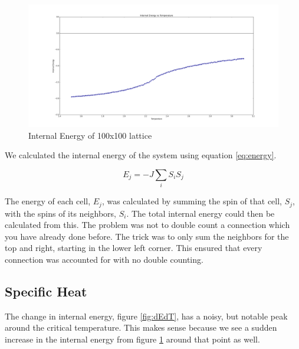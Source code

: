 \documentclass[a4paper,twoside,12pt]{article}
\begin{document}
\begin{figure}[h]
\centering
\includegraphics[scale=0.2]{Figures/energy2.png}
\caption{Internal Energy of 100x100 lattice}
\label{fig:energy2}
\end{figure} 

\noindent We calculated the internal energy of the system using equation \ref{eq:energy}.

\begin{equation}
\label{eq:energy}
E_{j} = -J\sum_{i} S_{i}S_{j}
\end{equation}

\noindent The energy of each cell, $E_{j}$, was calculated by summing the spin of that cell, $S_{j}$, with the spins of its neighbors, $S_{i}$. The total internal energy could then be calculated from this. The problem was not to double count a connection which you have already done before. The trick was to only sum the neighbors for the top and right, starting in the lower left corner. This ensured that every connection was accounted for with no double counting.

\subsection{Specific Heat}
The change in internal energy, figure \ref{fig:dEdT}, has a noisy, but notable peak around the critical temperature. This makes sense because we see a sudden increase in the internal energy from figure \ref{fig:energy2} around that point as well. 
\end{document}
